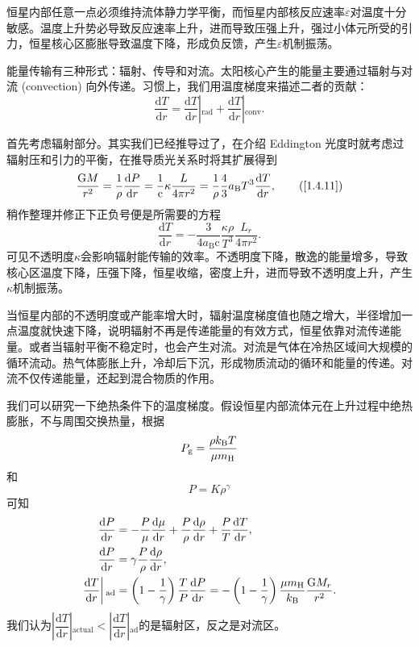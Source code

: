 \documentclass[../天体物理基础.tex]{subfiles}
\begin{document}
恒星内部任意一点必须维持流体静力学平衡，而恒星内部核反应速率$\varepsilon$对温度十分敏感。温度上升势必导致反应速率上升，进而导致压强上升，强过小体元所受的引力，恒星核心区膨胀导致温度下降，形成负反馈，产生$\varepsilon$机制振荡。

能量传输有三种形式：辐射、传导和对流。太阳核心产生的能量主要通过辐射与对流 (convection) 向外传递。习惯上，我们用温度梯度来描述二者的贡献：
\begin{equation}
\frac{\mathrm{d}T}{\mathrm{d}r}=\left.\frac{\mathrm{d}T}{\mathrm{d}r}\right\vert{}_{\text{rad}}+\left.\frac{\mathrm{d}T}{\mathrm{d}r}\right\vert{}_{\text{conv}}.
\end{equation}

首先考虑辐射部分。其实我们已经推导过了，在介绍 Eddington 光度时就考虑过辐射压和引力的平衡，在推导质光关系时将其扩展得到
\begin{equation}
\frac{\mathrm{G}M}{r^{2}}=\frac{1}{\rho}\frac{\mathrm{d}P}{\mathrm{d}r}=\frac{1}{\mathrm{c}}\kappa\frac{L}{4\pi r^{2}}=\frac{1}{\rho}\frac{4}{3}a_{\text{B}}T^{3}\frac{\mathrm{d}T}{\mathrm{d}r},\tag{\ref{1.4.11}}
\end{equation}
稍作整理并修正下正负号便是所需要的方程
\begin{equation}
\frac{\mathrm{d}T}{\mathrm{d}r}=-\frac{3}{4a_{\text{B}}\mathrm{c}}\frac{\kappa\rho}{T^{3}}\frac{L_{r}}{4\pi r^{2}}.
\end{equation}
可见不透明度$\kappa$会影响辐射能传输的效率。不透明度下降，散逸的能量增多，导致核心区温度下降，压强下降，恒星收缩，密度上升，进而导致不透明度上升，产生$\kappa$机制振荡。

当恒星内部的不透明度或产能率增大时，辐射温度梯度值也随之增大，半径增加一点温度就快速下降，说明辐射不再是传递能量的有效方式，恒星依靠对流传递能量。或者当辐射平衡不稳定时，也会产生对流。对流是气体在冷热区域间大规模的循环流动。热气体膨胀上升，冷却后下沉，形成物质流动的循环和能量的传递。对流不仅传递能量，还起到混合物质的作用。

我们可以研究一下绝热条件下的温度梯度。假设恒星内部流体元在上升过程中绝热膨胀，不与周围交换热量，根据
\begin{equation}
P_{\text{g}}=\frac{\rho k_{\text{B}}T}{\mu m_{\ce{H}}}
\end{equation}
和
\begin{equation}
P=K\rho^{\gamma}
\end{equation}
可知
\begin{align}
\frac{\mathrm{d}P}{\mathrm{d}r}&=-\frac{P}{\mu}\frac{\mathrm{d}\mu}{\mathrm{d}r}+\frac{P}{\rho}\frac{\mathrm{d}\rho}{\mathrm{d}r}+\frac{P}{T}\frac{\mathrm{d}T}{\mathrm{d}r},\notag\\
\frac{\mathrm{d}P}{\mathrm{d}r}&=\gamma\frac{P}{\rho}\frac{\mathrm{d}\rho}{\mathrm{d}r},\notag\\
\left.\frac{\mathrm{d}T}{\mathrm{d}r}\right\vert{}_{\text{ad}}&=\left(1-\frac{1}{\gamma}\right)\frac{T}{P}\frac{\mathrm{d}P}{\mathrm{d}r}=-\left(1-\frac{1}{\gamma}\right)\frac{\mu m_{\ce{H}}}{k_{\text{B}}}\frac{\mathrm{G}M_{r}}{r^{2}}.
\end{align}
我们认为$\left\vert{}\dfrac{\mathrm{d}T}{\mathrm{d}r}\right\vert{}_{\text{actual}}<\left\vert{}\dfrac{\mathrm{d}T}{\mathrm{d}r}\right\vert{}_{\text{ad}}$的是辐射区，反之是对流区。
\end{document}
